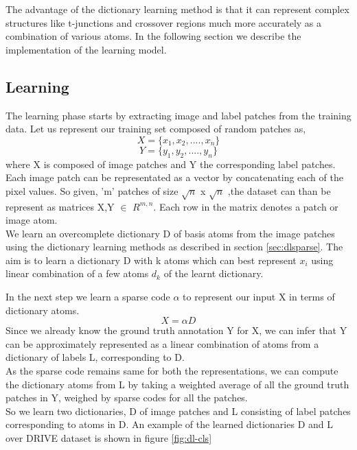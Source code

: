 The advantage of the dictionary learning method is that it can represent complex structures like t-junctions and crossover regions much more accurately as a combination of various atoms. In the following section we describe the implementation of the learning model.

\subsection{Learning}
The learning phase starts by extracting image and label patches from the training data. Let us represent our training set composed of random patches as,
$$
X = \{x_1,x_2,....,x_n\}
$$
$$
Y = \{y_1,y_2,....,y_n\}
$$
where X is composed of image patches and Y the corresponding label patches. Each image patch can be representated as a vector by concatenating each of the pixel values. So given, 'm' patches of size $\sqrt{n}$ x $\sqrt{n}$ ,the dataset can than be represent as matrices 
X,Y $\in$ $R^{m,n}$. Each row in the matrix denotes a patch or image atom.\\

We learn an overcomplete dictionary D of basis atoms from the image patches using the dictionary learning methods as described in section \ref{sec:dlsparse}. The aim is to learn a dictionary D with k atoms which can best represent $x_i$ using linear combination of a few atoms $d_k$ of the learnt dictionary.

In the next step we learn a sparse code $\alpha$ to represent our input X in terms of dictionary atoms.
$$
X = \alpha D
$$ 
Since we already know the ground truth annotation Y for X, we can infer that Y can be approximately represented as a linear combination of atoms from a dictionary of labels L, corresponding to D.\\

As the sparse code remains same for both the representations, we can compute the dictionary atoms from L by taking a weighted average of all the ground truth patches in Y, weighed by sparse codes for all the patches.\\

So we learn two dictionaries, D of image patches and L consisting of label patches corresponding to atoms in D. An example of the learned dictionaries D and L over DRIVE dataset is shown in figure \ref{fig:dl-cls}

